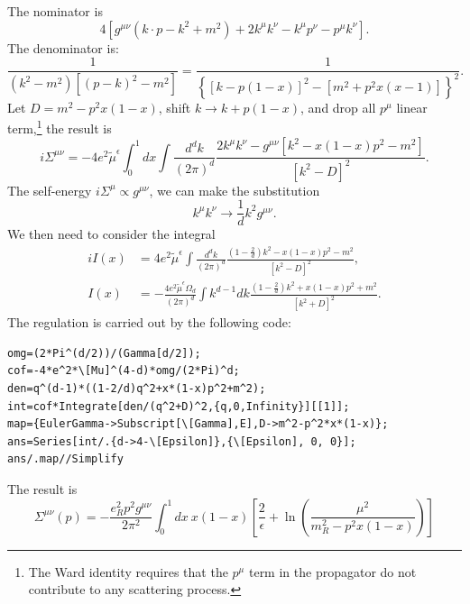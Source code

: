 The nominator is
\begin{equation}
	4 \left[g^{\mu\nu} \left(k\cdot p-{k}^2+m^2\right)+ 2k^\mu k^\nu - k^\mu p^\nu - p^\mu k^\nu \right].
\end{equation}
The denominator is:
\begin{equation}
	\frac{1}{(k^2-m^2)[(p-k)^2-m^2]}
	= \frac{1}{\left\{[k-p(1-x)]^2-[m^2+p^2 x(x-1)]\right\}^2}.
\end{equation}
Let $D=m^2-p^2 x(1-x)$, shift $k \rightarrow k + p(1-x)$, and drop all $p^\mu$ linear term,\footnote{The Ward identity requires that the $p^\mu$ term in the propagator do not contribute to any scattering process.} the result is
\begin{equation}
	i\Sigma^{\mu \nu}= -4 e^{2}\tilde{\mu}^{\epsilon} \int_0^1 dx
		\int \frac{d^{d} k}{(2 \pi)^{d}}  \frac{2 k^{\mu} k^{\nu}-g^{\mu \nu}\left[k^{2}-x(1-x) p^{2}-m^{2}\right]}{\left[k^{2}-D\right]^{2}}.
\end{equation}
The self-energy $i\Sigma^\mu \propto g^{\mu\nu}$, we can make the substitution
\begin{equation*}
	k^\mu k^\nu \rightarrow \frac{1}{d} k^2 g^{\mu\nu}.
\end{equation*}
We then need to consider the integral
\begin{equation*}
\begin{aligned}
	iI(x) &= 4e^2\tilde{\mu}^{\epsilon} \int\frac{d^d k}{(2 \pi)^{d}}  
		\frac{(1-\frac{2}{d})k^{2}-x(1-x) p^{2}-m^{2}}{\left[k^{2}-D\right]^{2}}, \\
	I(x) &= -\frac{4e^2\tilde{\mu}^{\epsilon} \Omega_d }{(2\pi)^d}
		\int k^{d-1} dk \frac{(1-\frac{2}{d})k^{2}+x(1-x) p^{2}+m^{2}}{\left[k^{2}+D\right]^{2}}.
\end{aligned}
\end{equation*}
The regulation is carried out by the following code:
\begin{lstlisting}[style=mathematicaFrameTB]
omg=(2*Pi^(d/2))/(Gamma[d/2]);
cof=-4*e^2*\[Mu]^(4-d)*omg/(2*Pi)^d;
den=q^(d-1)*((1-2/d)q^2+x*(1-x)p^2+m^2);
int=cof*Integrate[den/(q^2+D)^2,{q,0,Infinity}][[1]];
map={EulerGamma->Subscript[\[Gamma],E],D->m^2-p^2*x*(1-x)};
ans=Series[int/.{d->4-\[Epsilon]},{\[Epsilon], 0, 0}];
ans/.map//Simplify
\end{lstlisting}
The result is
\begin{equation}
	\Sigma^{\mu\nu}(p) 
	= -\frac{e_R^2 p^2 g^{\mu\nu}}{2\pi^2} \int_0^1 dx\ x(1-x)
	\left[\frac{2}{\epsilon}+\ln\left(\frac{\mu^2}{m_R^2-p^2 x(1-x)}\right)\right]
\end{equation}
